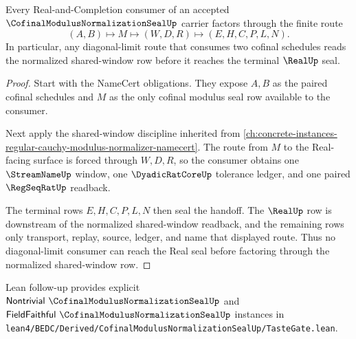 \begin{theorem}
\label{thm:cofinal-modulus-normalization-seal-real-completion-handoff}
Every Real-and-Completion consumer of an accepted $\CofinalModulusNormalizationSealUp$ carrier factors through the finite route
$$
(A,B)\longmapsto M\longmapsto(W,D,R)\longmapsto(E,H,C,P,L,N).
$$
In particular, any diagonal-limit route that consumes two cofinal schedules reads the normalized shared-window row before it reaches the terminal $\RealUp$ seal.
\end{theorem}
\begin{proof}
Start with the NameCert obligations. They expose $A,B$ as the paired cofinal schedules and $M$ as the only cofinal modulus seal row available to the consumer.

Next apply the shared-window discipline inherited from \autoref{ch:concrete-instances-regular-cauchy-modulus-normalizer-namecert}. The route from $M$ to the Real-facing surface is forced through $W,D,R$, so the consumer obtains one $\StreamNameUp$ window, one $\DyadicRatCoreUp$ tolerance ledger, and one paired $\RegSeqRatUp$ readback.

The terminal rows $E,H,C,P,L,N$ then seal the handoff. The $\RealUp$ row is downstream of the normalized shared-window readback, and the remaining rows only transport, replay, source, ledger, and name that displayed route. Thus no diagonal-limit consumer can reach the Real seal before factoring through the normalized shared-window row.
\end{proof}



Lean follow-up provides explicit $\mathsf{Nontrivial}\ \CofinalModulusNormalizationSealUp$ and $\mathsf{FieldFaithful}\ \CofinalModulusNormalizationSealUp$ instances in \texttt{lean4/BEDC/Derived/CofinalModulusNormalizationSealUp/TasteGate.lean}.

